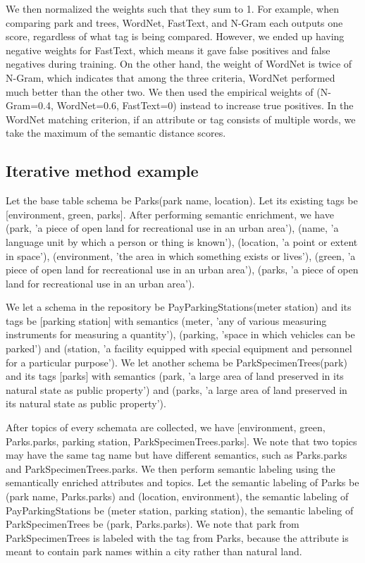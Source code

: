 We then normalized the weights such that they sum to 1. For example, when comparing park and trees, WordNet, FastText, and N-Gram each outputs one score, regardless of what tag is being compared. However, we ended up having negative weights for FastText, which means it gave false positives and false negatives during training. On the other hand, the weight of WordNet is twice of N-Gram, which indicates that among the three criteria, WordNet performed much better than the other two. We then used the empirical weights of (N-Gram=0.4, WordNet=0.6, FastText=0) instead to increase true positives. In the WordNet matching criterion, if an attribute or tag consists of multiple words, we take the maximum of the semantic distance scores.

\subsection{Iterative method example}
\label{ssec:IterativeMethodExample2}

Let the base table schema be Parks(park name, location). Let its existing tags be [environment, green, parks]. After performing semantic enrichment, we have (park, 'a piece of open land for recreational use in an urban area'), (name, 'a language unit by which a person or thing is known'), (location, 'a point or extent in space'), (environment, 'the area in which something exists or lives'), (green, 'a piece of open land for recreational use in an urban area'), (parks, 'a piece of open land for recreational use in an urban area').

We let a schema in the repository be PayParkingStations(meter station) and its tags be [parking station] with semantics (meter, 'any of various measuring instruments for measuring a quantity'), (parking, 'space in which vehicles can be parked') and (station, 'a facility equipped with special equipment and personnel for a particular purpose'). We let another schema be ParkSpecimenTrees(park) and its tags [parks] with semantics (park, 'a large area of land preserved in its natural state as public property') and (parks, 'a large area of land preserved in its natural state as public property').

After topics of every schemata are collected, we have [environment, green, Parks.parks, parking station, ParkSpecimenTrees.parks]. We note that two topics may have the same tag name but have different semantics, such as Parks.parks and ParkSpecimenTrees.parks. We then perform semantic labeling using the semantically enriched attributes and topics. Let the semantic labeling of Parks be (park name, Parks.parks) and (location, environment), the semantic labeling of PayParkingStations be (meter station, parking station), the semantic labeling of ParkSpecimenTrees be (park, Parks.parks). We note that park from ParkSpecimenTrees is labeled with the tag from Parks, because the attribute is meant to contain park names within a city rather than natural land.

